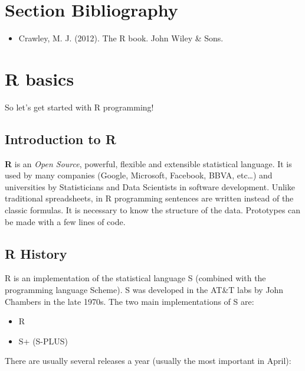 \documentclass[
]{book}
\providecommand{\tightlist}{%
  \setlength{\itemsep}{0pt}\setlength{\parskip}{0pt}}
\theoremstyle{definition}
\theoremstyle{definition}
\theoremstyle{definition}
\theoremstyle{definition}
\theoremstyle{remark}
\begin{document}
\hypertarget{section-bibliography}{%
\section{Section Bibliography}\label{section-bibliography}}

\begin{itemize}
\tightlist
\item
  Crawley, M. J. (2012). The R book. John Wiley \& Sons.
\end{itemize}

\hypertarget{r-basics}{%
\section{R basics}\label{r-basics}}

So let's get started with R programming!

\hypertarget{introduction-to-r}{%
\subsection{Introduction to R}\label{introduction-to-r}}

\textbf{R} is an \emph{Open Source}, powerful, flexible and extensible statistical language. It is used by many companies (Google, Microsoft, Facebook, BBVA, etc\ldots) and universities by Statisticians and Data Scientists in software development. Unlike traditional spreadsheets, in R programming sentences are written instead of the classic formulas. It is necessary to know the structure of the data. Prototypes can be made with a few lines of code.

\hypertarget{r-history}{%
\subsection{R History}\label{r-history}}

R is an implementation of the statistical language S (combined with the programming language Scheme). S was developed in the AT\&T labs by John Chambers in the late 1970s. The two main implementations of S are:

\begin{itemize}
\tightlist
\item
  R
\item
  S+ (S-PLUS)
\end{itemize}

There are usually several releases a year (usually the most important in April):
\end{document}
